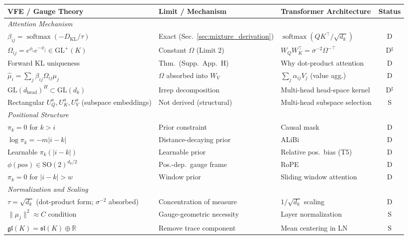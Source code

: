 \documentclass[twoside,11pt]{article}
\newcommand{\softmax}{\operatorname{softmax}}
\newcommand{\KL}{\operatorname{KL}}
\begin{document}
\begin{table}[p]
\centering
\renewcommand{\arraystretch}{1.15}
\setlength{\tabcolsep}{4pt}
\small
\begin{tabular}{|l|l|l|c|}
\hline
\textbf{VFE / Gauge Theory} & \textbf{Limit / Mechanism} & \textbf{Transformer Architecture} & \textbf{Status} \\
\hline
\multicolumn{4}{|l|}{\textit{Attention Mechanism}} \\
\hline
$\beta_{ij} = \softmax(-D_{\KL}/\tau)$ & Exact (Sec.~\ref{sec:mixture_derivation}) & $\softmax(QK^\top / \sqrt{d_k})$ & D \\
$\Omega_{ij} = e^{\phi_i}e^{-\phi_j} \in \mathrm{GL}^+(K)$ & Constant $\Omega$ (Limit 2) & $W_Q W_K^\top = \sigma^{-2}\Omega^{-\top}$ & D$^\sharp$ \\
Forward KL uniqueness & Thm.\ (Supp.~App.~H) & Why dot-product attention & D \\
$\hat\mu_i = \sum_j \beta_{ij}\Omega_{ij}\mu_j$ & $\Omega$ absorbed into $W_V$ & $\sum_j \alpha_{ij} V_j$ (value agg.) & D \\
$\mathrm{GL}(d_{\text{head}})^H \subset \mathrm{GL}(d_k)$ & Irrep decomposition & Multi-head head-space kernel & D$^\sharp$ \\
Rectangular $U_Q^a, U_K^a, U_V^a$ (subspace embeddings) & Not derived (structural) & Multi-head subspace selection & S \\
\hline
\multicolumn{4}{|l|}{\textit{Positional Structure}} \\
\hline
$\pi_k = 0$ for $k > i$ & Prior constraint & Causal mask & D \\
$\log\pi_k = -m|i - k|$ & Distance-decaying prior & ALiBi & D \\
Learnable $\pi_k(|i - k|)$ & Learnable prior & Relative pos.\ bias (T5) & D \\
$\phi(pos) \in \mathrm{SO}(2)^{d_k/2}$ & Pos.-dep.\ gauge frame & RoPE & D \\
$\pi_k = 0$ for $|i - k|>w$ & Window prior & Sliding window attention & D \\
\hline
\multicolumn{4}{|l|}{\textit{Normalization and Scaling}} \\
\hline
$\tau = \sqrt{d_k}$ (dot-product form; $\sigma^{-2}$ absorbed) & Concentration of measure & $1/\sqrt{d_k}$ scaling & D \\
$\|\mu_j\|^2 \approx C$ condition & Gauge-geometric necessity & Layer normalization & S \\
$\mathfrak{gl}(K) = \mathfrak{sl}(K) \oplus \mathbb{R}$ & Remove trace component & Mean centering in LN & S \\

\end{tabular}
\end{table}
\end{document}
